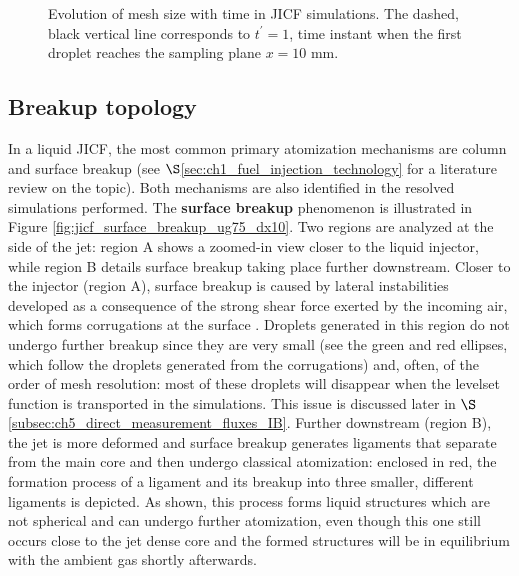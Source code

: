 \begin{figure}[ht]
%
   \caption[Evolution of mesh size with time in JICF simulations]{Evolution of mesh size with time in JICF simulations. The dashed, black vertical line corresponds to $t^\prime = 1$, time instant when the first droplet reaches the sampling plane $x = 10$ mm.}
\label{fig:JICF_nelem_increase}
\end{figure}

\subsection{Breakup topology}
\label{subsubsec:ch5_breakup_topology}

In a liquid JICF, the most common primary atomization mechanisms are column and surface breakup (see $\S$\ref{sec:ch1_fuel_injection_technology} for a literature review on the topic). Both mechanisms are also identified in the resolved simulations performed. The \textbf{surface breakup} phenomenon is illustrated in Figure \ref{fig:jicf_surface_breakup_ug75_dx10}. Two regions are analyzed at the side of the jet: region A shows a zoomed-in view closer to the liquid injector, while region B details surface breakup taking place further downstream. Closer to the injector (region A), surface breakup is caused by lateral instabilities developed as a consequence of the strong shear force exerted by the incoming air, which forms corrugations at the surface . Droplets generated in this region do not undergo further breakup since they are very small (see the green and red ellipses, which follow the droplets generated from the corrugations) and, often, of the order of mesh resolution: most of these droplets will disappear when the levelset function is transported in the simulations. This issue is discussed later in $\S$\ref{subsec:ch5_direct_measurement_fluxes_IB}. Further downstream (region B), the jet is more deformed and surface breakup generates ligaments that separate from the main core and then undergo classical atomization: enclosed in red, the formation process of a ligament and its breakup into three smaller, different ligaments is depicted. As shown, this process forms liquid structures which are not spherical and can undergo further atomization, even though this one still occurs close to the jet dense core and the formed structures will be in equilibrium with the ambient gas shortly afterwards.

